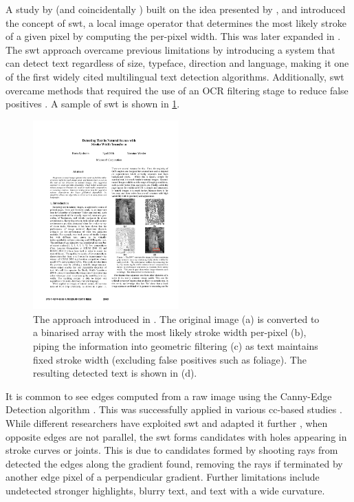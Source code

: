 A study by \citet{Epshtein:2010tj} (and coincidentally \citet{Zhang:2011cl}) built on the idea presented by \citeauthor{Subramanian:2007tf}, and introduced the concept of \gls{swt}, a local image operator that determines the most likely stroke of a given pixel by computing the per-pixel width. This was later expanded in \citet{Srivastav:2008ge}. The \gls{swt} approach overcame previous limitations by introducing a system that can detect text regardless of size, typeface, direction and language, making it one of the first widely cited multilingual text detection algorithms. Additionally, \gls{swt} overcame methods that required the use of an OCR filtering stage to reduce false positives \citep{Chen:2004tx, XiangrongChen:2004ha, Ye:2005wu}. A sample of \gls{swt} is shown in \cref{fig:background:detection:cc:epshtein2010_swt}.

\begin{figure}[h]
  \centering
  \includegraphics[width=0.5\textwidth]{images/background/epshtein2010_swt}
  \caption[Stroke Width Transformation from \citet{Epshtein:2010tj}]{The  approach introduced in \citep{Epshtein:2010tj}. The original image (a) is converted to a binarised array with the most likely stroke width per-pixel (b), piping the information into geometric filtering (c) as text maintains fixed stroke width (excluding false positives such as foliage). The resulting detected text is shown in (d).}
  \label{fig:background:detection:cc:epshtein2010_swt}
\end{figure}

It is common to see edges computed from a raw image using the Canny-Edge Detection algorithm \citep{Canny:1986uw}. This was successfully applied in various \gls{cc}-based studies \citep{Epshtein:2010tj, Chen:2011ul, Zhang:2010wa}. While different researchers have exploited \gls{swt} and adapted it further \cite{Shivakumara:2011dn, Zhang:2011cl}, when opposite edges are not parallel, the \gls{swt} forms candidates with holes appearing in stroke curves or joints. This is due to candidates formed by shooting rays from detected the edges along the gradient found, removing the rays if terminated by another edge pixel of a perpendicular gradient. Further limitations include undetected stronger highlights, blurry text, and text with a wide curvature.

